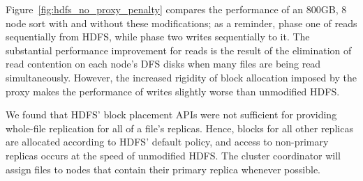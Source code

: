 Figure~\ref{fig:hdfs_no_proxy_penalty} compares the performance of an 800GB, 8
node sort with and without these modifications; as a reminder, phase one of
\themis reads sequentially from HDFS, while phase two writes sequentially to
it. The substantial performance improvement for reads is the result of the
elimination of read contention on each node's DFS disks when many files are
being read simultaneously. However, the increased rigidity of block allocation
imposed by the proxy makes the performance of writes slightly worse than
unmodified HDFS.

We found that HDFS' block placement APIs were not sufficient for providing
whole-file replication for all of a file's replicas. Hence, blocks for all
other replicas are allocated according to HDFS' default policy, and access to
non-primary replicas occurs at the speed of unmodified HDFS. The cluster
coordinator will assign files to nodes that contain their primary replica
whenever possible.
